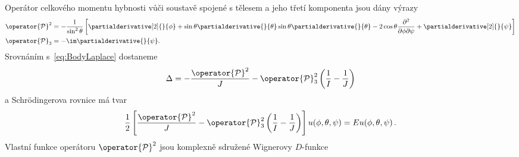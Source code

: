\begin{solution}
	\begin{note}
		Operátor celkového momentu hybnosti vůči soustavě spojené s tělesem 
		a jeho třetí komponenta jsou dány výrazy
		\begin{subequations}
			\begin{align}
				\operator{\mathcal{P}}^{2}
					&=-\frac{1}{\sin^{2}\theta}\left[\partialderivative[2]{}{\phi}
						+\sin{\theta}\partialderivative{}{\theta}\sin{\theta}\partialderivative{}{\theta}
						-2\cos{\theta}\frac{\partial^{2}}{\partial\phi\partial\psi}+\partialderivative[2]{}{\psi}\right]\\
				\operator{\mathcal{P}}_{3}
					&=-\im\partialderivative{}{\psi}.
			\end{align}				
		\end{subequations}
		Srovnáním s~\eqref{eq:BodyLaplace} dostaneme
		\begin{equation}
			\label{eq:tuheLaplaceP}
			\Delta=-\frac{\operator{\mathcal{P}}^{2}}{J}
				-\operator{\mathcal{P}}_{3}^{2}\left(\frac{1}{I}-\frac{1}{J}\right)
		\end{equation}
		a Schrödingerova rovnice má tvar
		\begin{equation}
			\label{eq:BodySchrodingerP}
			\frac{1}{2}\left[\frac{\operator{\mathcal{P}}^{2}}{J}
				-\operator{\mathcal{P}}_{3}^{2}\left(\frac{1}{I}-\frac{1}{J}\right)\right]
				u(\phi,\theta,\psi)=Eu(\phi,\theta,\psi)\,.
		\end{equation}
		Vlastní funkce operátoru $\operator{\mathcal{P}}^{2}$ jsou komplexně sdružené 
		Wignerovy $D$-funkce
\end{note}
\end{solution}
